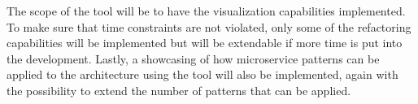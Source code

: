 The scope of the tool will be to have the visualization capabilities implemented.
To make sure that time constraints are not violated, only some of the refactoring capabilities will be implemented but will be extendable if more time is put into the development.
Lastly, a showcasing of how microservice patterns can be applied to the architecture using the tool will also be implemented, again with the possibility to extend the number of patterns that can be applied.

